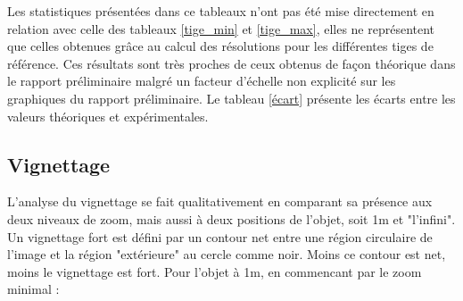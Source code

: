 \documentclass[11pt,letterpaper]{article}
\begin{document}
\begin{table}[h!]
\centering
{}
\caption{Tableau de la résolution en fonction de la position du zoom.}
\label{max_patron}
\end{table}

Les statistiques présentées dans ce tableaux n'ont pas été mise directement en relation avec celle des tableaux \ref{tige_min} et \ref{tige_max}, elles ne représentent que celles obtenues grâce au calcul des résolutions pour les différentes tiges de référence. Ces résultats sont très proches de ceux obtenus de façon théorique dans le rapport préliminaire malgré un facteur d'échelle non explicité sur les graphiques du rapport préliminaire. Le tableau \ref{écart} présente les écarts entre les valeurs théoriques et expérimentales. 

\begin{table}[h!]
\centering
{}
\caption{Tableau des écarts entre les valeurs théoriques et expérimentales.}
\label{écart}
\end{table}


\subsection{Vignettage}

L'analyse du vignettage se fait qualitativement en comparant sa présence aux deux
niveaux de zoom, mais aussi à deux positions de l'objet, soit 1m et "l'infini". 
Un vignettage fort est défini par un contour net entre une région circulaire de 
l'image et la région "extérieure" au cercle comme noir. Moins ce contour est net, 
moins le vignettage est fort. Pour l'objet à 1m, en commencant par le zoom minimal : 
\end{document}
